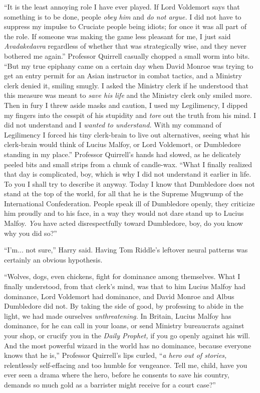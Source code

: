 ``It is the least annoying role I have ever played. If Lord Voldemort says that something is to be done, people \emph{obey him} and \emph{do not argue.} I did not have to suppress my impulse to Cruciate people being idiots; for once it was all part of the role. If someone was making the game less pleasant for me, I just said \emph{Avadakedavra} regardless of whether that was strategically wise, and they never bothered me again.'' Professor Quirrell casually chopped a small worm into bits. ``But my true epiphany came on a certain day when David Monroe was trying to get an entry permit for an Asian instructor in combat tactics, and a Ministry clerk denied it, smiling smugly. I asked the Ministry clerk if he understood that this measure was meant to \emph{save his life} and the Ministry clerk only smiled more. Then in fury I threw aside masks and caution, I used my Legilimency, I dipped my fingers into the cesspit of his stupidity and \emph{tore} out the truth from his mind. I did not understand and I \emph{wanted to understand.} With my command of Legilimency I forced his tiny clerk-brain to live out alternatives, seeing what his clerk-brain would think of Lucius Malfoy, or Lord Voldemort, or Dumbledore standing in my place.'' Professor Quirrell's hands had slowed, as he delicately peeled bits and small strips from a chunk of candle-wax. ``What I finally realized that day is complicated, boy, which is why I did not understand it earlier in life. To you I shall try to describe it anyway. Today I know that Dumbledore does not stand at the top of the world, for all that he is the Supreme Mugwump of the International Confederation. People speak ill of Dumbledore openly, they criticize him proudly and to his face, in a way they would not dare stand up to Lucius Malfoy. \emph{You} have acted disrespectfully toward Dumbledore, boy, do you know why you did so?''

``I'm... not sure,'' Harry said. Having Tom Riddle's leftover neural patterns was certainly an obvious hypothesis.

``Wolves, dogs, even chickens, fight for dominance among themselves. What I finally understood, from that clerk's mind, was that to him Lucius Malfoy had dominance, Lord Voldemort had dominance, and David Monroe and Albus Dumbledore did not. By taking the side of good, by professing to abide in the light, we had made ourselves \emph{unthreatening.} In Britain, Lucius Malfoy has dominance, for he can call in your loans, or send Ministry bureaucrats against your shop, or crucify you in the \emph{Daily Prophet,} if you go openly against his will. And the most powerful wizard in the world has no dominance, because everyone knows that he is,'' Professor Quirrell's lips curled, ``\emph{a hero out of stories,} relentlessly self-effacing and too humble for vengeance. Tell me, child, have you ever seen a drama where the hero, before he consents to save his country, demands so much gold as a barrister might receive for a court case?''

